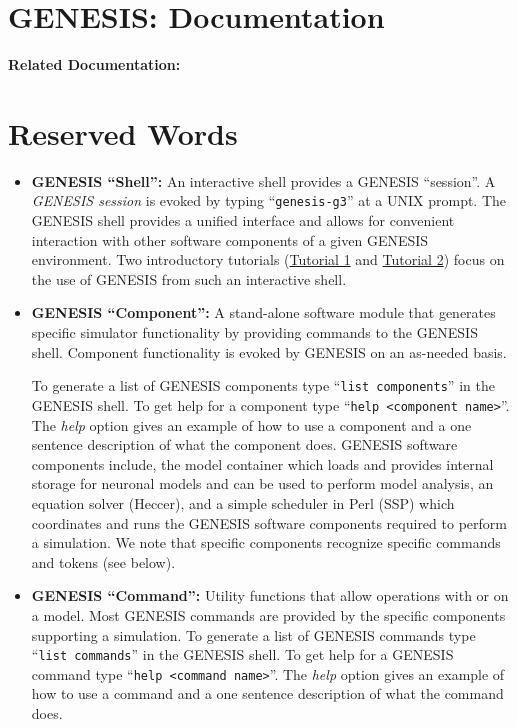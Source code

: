 \documentclass[12pt]{article}
\begin{document}
\section*{GENESIS: Documentation}

{\bf Related Documentation:}

\section*{Reserved Words}

\begin{itemize}

\item {\bf GENESIS ``Shell'':} An interactive shell provides a GENESIS ``session''. A {\it GENESIS session} is evoked by typing ``{\tt genesis-g3}'' at a UNIX prompt. The GENESIS shell provides a unified interface and allows for convenient interaction with other software components of a given GENESIS environment.  Two introductory tutorials (\href{../tutorial1/tutorial1.tex}{Tutorial 1} and \href{../tutorial2/tutorial2.tex}{Tutorial 2}) focus on the use of GENESIS from such an interactive shell.

\item {\bf GENESIS ``Component'':}  A stand-alone software module that generates specific simulator functionality by providing commands to the GENESIS shell. Component functionality is evoked by GENESIS on an as-needed basis.

To generate a list of GENESIS components type ``{\tt list components}'' in the GENESIS shell. To get help for a component type ``{\tt help <component name>}''. The {\it help} option gives an example of how to use a component and a one sentence description of what the component does. GENESIS software components include, the model container which loads and provides internal storage for neuronal models and can be used to perform model analysis, an equation solver (Heccer), and a simple scheduler in Perl (SSP) which coordinates and runs the GENESIS software components required to perform a simulation. We note that specific components recognize specific commands and tokens (see below).

\item {\bf GENESIS ``Command'':} Utility functions that allow operations with or on a model. Most GENESIS commands are provided by the specific components supporting a simulation. To generate a list of GENESIS commands type ``{\tt list commands}'' in the GENESIS shell. To get help for a GENESIS command type ``{\tt help <command name>}''. The {\it help} option gives an example of how to use a command and a one sentence description of what the command does.


\end{itemize}
\end{document}
